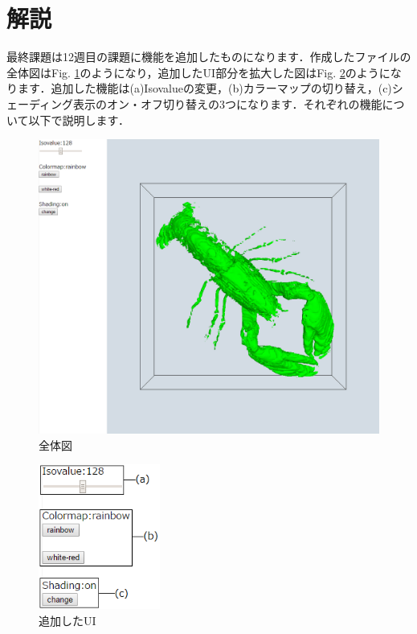 ﻿\documentclass[a4paper,10pt,fleqn]{jarticle}
\begin{document}
\section{解説}
最終課題は12週目の課題に機能を追加したものになります．作成したファイルの全体図はFig. \ref{全体図}のようになり，追加したUI部分を拡大した図はFig. \ref{UI}のようになります．追加した機能は(a)Isovalueの変更，(b)カラーマップの切り替え，(c)シェーディング表示のオン・オフ切り替えの3つになります．それぞれの機能について以下で説明します．
\begin{figure}[H]
\renewcommand{\figurename}{Fig.}
\begin{center}
\includegraphics[width=14cm,bb=0 0 1041 899]{全体図.png}
\caption{全体図}
\label{全体図}
\end{center}
\end{figure}
\begin{figure}[H]
\renewcommand{\figurename}{Fig.}
\begin{center}
\includegraphics[width=4cm,bb=0 0 199 237]{UI.png}
\caption{追加したUI}
\label{UI}
\end{center}
\end{figure}
\end{document}
